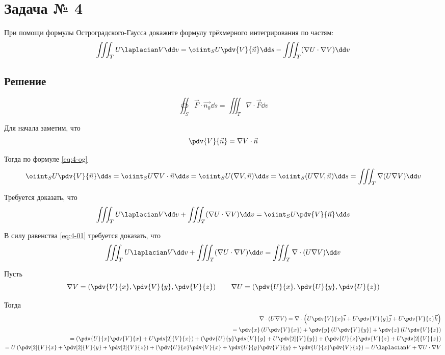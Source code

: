\section{Задача № 4}

При помощи формулы Остроградского-Гаусса докажите формулу трёхмерного
интегрирования по частям:
\[
  \iiint_{T} U \laplacian V \dd v
  = \oiint_{S} U \pdv{V}{\vec{n}} \dd s
  - \iiint_{T} (\nabla U \cdot \nabla V) \dd v
\]

\subsection{Решение}

\begin{equation}\label{eq:4-og}
  \tag{Формула Гаусса-Остроградского}
  \oiint_{S} \vec{F} \cdot \vec{n_0} \dd s
  = \iiint_{T} \nabla \cdot \vec{F} \dd v
\end{equation}

Для начала заметим, что
\[
  \pdv{V}{\vec{n}} = \nabla V \cdot \vec{n}
\]

Тогда по формуле \ref{eq:4-og}
\begin{equation}\label{eq:4-01}
  \oiint_{S} U \pdv{V}{\vec{n}} \dd s
  = \oiint_{S} U \nabla V \cdot \vec{n} \dd s
  = \oiint_{S} U (\nabla V, \vec{n}) \dd s
  = \oiint_{S} (U \nabla V, \vec{n}) \dd s
  = \iiint_{T} \nabla (U \nabla V) \dd v
\end{equation}

Требуется доказать, что
\[
  \iiint_{T} U \laplacian V \dd v
  + \iiint_{T} (\nabla U \cdot \nabla V) \dd v
  = \oiint_{S} U \pdv{V}{\vec{n}} \dd s
\]

В силу равенства \ref{eq:4-01} требуется доказать, что
\[
  \iiint_{T} U \laplacian V \dd v
  + \iiint_{T} (\nabla U \cdot \nabla V) \dd v
  = \iiint_{T} \nabla \cdot (U \nabla V) \dd v
\]

Пусть
\[
  \nabla V
  = \left(\pdv{V}{x}, \pdv{V}{y}, \pdv{V}{z}\right) \qquad
  \nabla U
  = \left(\pdv{U}{x}, \pdv{U}{y}, \pdv{U}{z}\right)
\]

Тогда
\[
\begin{split}
  \nabla \cdot (U \nabla V)
  = \nabla \cdot \left(U \pdv{V}{x} \vec{i} + U \pdv{V}{y} \vec{j} + U \pdv{V}{z} \vec{k}\right) \\
  = \pdv{x} \left(U \pdv{V}{x}\right)
  + \pdv{y} \left(U \pdv{V}{y}\right)
  + \pdv{z} \left(U \pdv{V}{z}\right) \\
  = \left(\pdv{U}{x} \pdv{V}{x} + U \pdv[2]{V}{x}\right)
  + \left(\pdv{U}{y} \pdv{V}{y} + U \pdv[2]{V}{y}\right)
  + \left(\pdv{U}{z} \pdv{V}{z} + U \pdv[2]{V}{z}\right) \\
  = U\left(\pdv[2]{V}{x} + \pdv[2]{V}{y} + \pdv[2]{V}{z}\right)
  + \left(\pdv{U}{x} \pdv{V}{x} + \pdv{U}{y} \pdv{V}{y} + \pdv{U}{z} \pdv{V}{z}\right)
  = U \laplacian V + \nabla U \cdot \nabla V
\end{split}
\]

